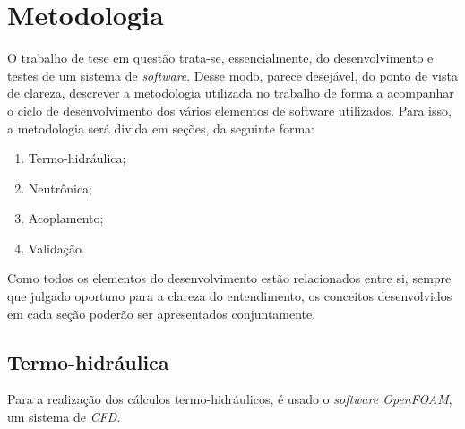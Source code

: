 \chapter{Metodologia}
\label{chap:metodologia}

O trabalho de tese em questão trata-se, essencialmente, do desenvolvimento e testes
de um sistema de \textit{software}. Desse modo, parece desejável, do ponto de vista de
clareza, descrever a metodologia utilizada no trabalho de forma a acompanhar o ciclo
de desenvolvimento dos vários elementos de software utilizados. Para isso, a metodologia
será divida em seções, da seguinte forma:
\begin{enumerate}
\item Termo-hidráulica;
\item Neutrônica;
\item Acoplamento;
  \item Validação.
  \end{enumerate}

Como todos os elementos do desenvolvimento estão relacionados entre si, sempre que
julgado oportuno para a clareza do entendimento, os conceitos desenvolvidos em cada
seção poderão ser apresentados conjuntamente.

\section{Termo-hidráulica}
\label{sec:th}

Para a realização dos cálculos termo-hidráulicos, é usado o \textit{software OpenFOAM},
um sistema de \textit{CFD}.
